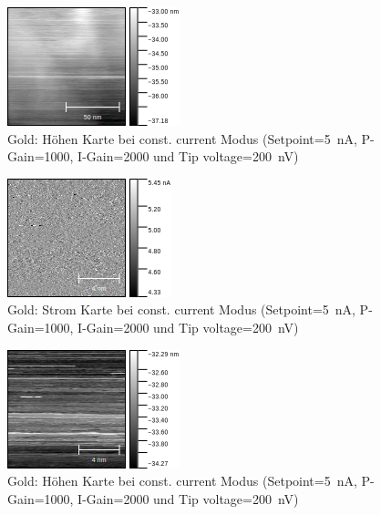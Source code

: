 \documentclass[sn-mathphys-num,iicol]{sn-jnl}
\theoremstyle{thmstyleone}
\theoremstyle{thmstyletwo}
\theoremstyle{thmstylethree}
\begin{document}
\begin{figure}[t]
        \centering
        \includegraphics[width=.5\textwidth]{../data/Graphit3_z.png}
        \caption{Gold: Höhen Karte bei const. current Modus (Setpoint=\SI{5}{\nano A}, P-Gain=\SI{1000}{}, I-Gain=\SI{2000}{} und Tip voltage=\SI{200}{\nano V})} \label{fig:gr3z}
\end{figure}
\begin{figure}[t]
        \centering
        \includegraphics[width=.5\textwidth]{../data/Graphit4_current.png}
        \caption{Gold: Strom Karte bei const. current Modus (Setpoint=\SI{5}{\nano A}, P-Gain=\SI{1000}{}, I-Gain=\SI{2000}{} und Tip voltage=\SI{200}{\nano V})} \label{fig:gr4c}
\end{figure}
\begin{figure}[t]
        \centering
        \includegraphics[width=.5\textwidth]{../data/Graphit4_z.png}
        \caption{Gold: Höhen Karte bei const. current Modus (Setpoint=\SI{5}{\nano A}, P-Gain=\SI{1000}{}, I-Gain=\SI{2000}{} und Tip voltage=\SI{200}{\nano V})} \label{fig:gr4z}
\end{figure}
\end{document}
